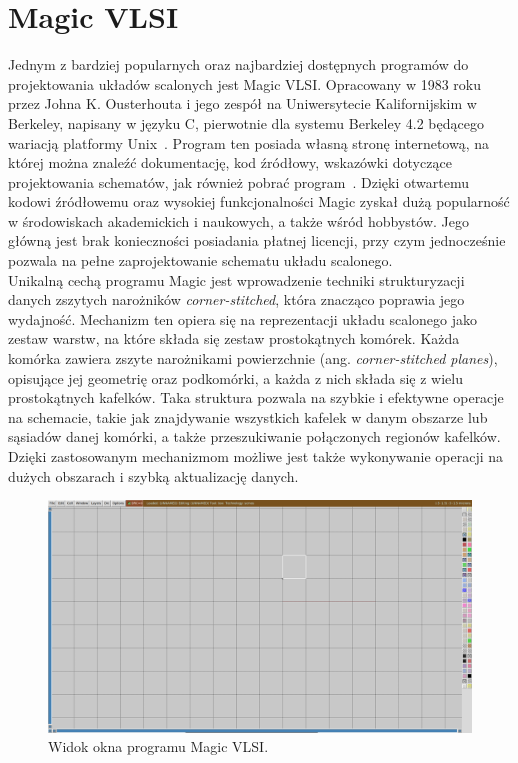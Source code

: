 \section{Magic VLSI}

Jednym z bardziej popularnych oraz najbardziej dostępnych programów do projektowania układów scalonych
jest Magic VLSI\@.
Opracowany w 1983 roku przez Johna K. Ousterhouta i jego zespół na Uniwersytecie Kalifornijskim w Berkeley,
napisany w języku C, pierwotnie dla systemu Berkeley 4.2 będącego wariacją platformy Unix~\cite{MAGIC_article}.
Program ten posiada własną stronę internetową, na której można znaleźć dokumentację, kod źródłowy,
wskazówki dotyczące projektowania schematów, jak również pobrać program~\cite{MAGIC_site}.
Dzięki otwartemu kodowi źródłowemu oraz wysokiej funkcjonalności Magic zyskał dużą popularność
w środowiskach akademickich i naukowych, a także wśród hobbystów.
Jego główną jest brak konieczności posiadania płatnej licencji,
przy czym jednocześnie pozwala na pełne zaprojektowanie schematu układu scalonego.\\
\newpage
\indent Unikalną cechą programu Magic jest wprowadzenie techniki strukturyzacji danych
zszytych narożników \textit{corner-stitched},
która znacząco poprawia jego wydajność.
Mechanizm ten opiera się na reprezentacji układu scalonego jako zestaw warstw,
na które składa się zestaw prostokątnych komórek.
Każda komórka zawiera zszyte narożnikami powierzchnie (ang. \textit{corner-stitched planes}),
opisujące jej geometrię oraz podkomórki, a każda z nich składa się z wielu prostokątnych kafelków.
Taka struktura pozwala na szybkie i efektywne operacje na schemacie,
takie jak znajdywanie wszystkich kafelek w danym obszarze lub sąsiadów danej komórki,
a także przeszukiwanie połączonych regionów kafelków.
Dzięki zastosowanym mechanizmom możliwe jest także wykonywanie operacji na dużych obszarach
i szybką aktualizację danych.

\begin{figure}[h]
    \centering
    \includegraphics[width=\textwidth]{chapters/chapter2/img/magic_okno}
    \caption{Widok okna programu Magic VLSI.}
    \label{fig:magic_okno}
\end{figure}

